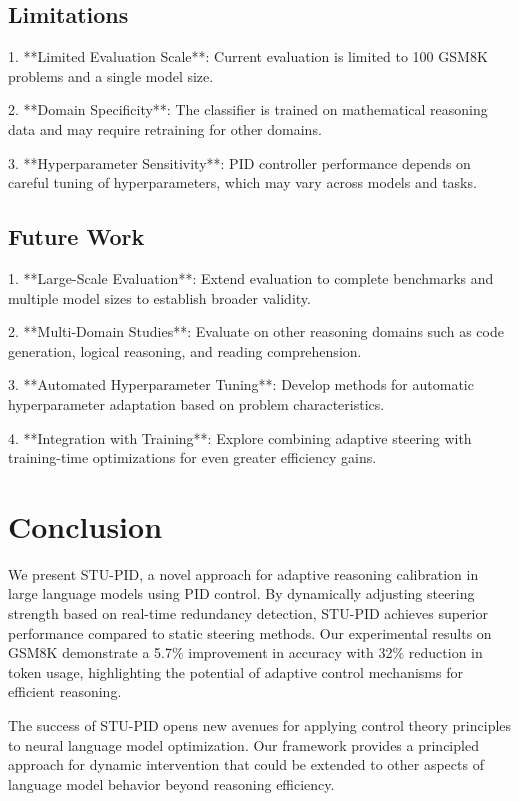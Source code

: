 \documentclass{article}
\begin{document}
\subsection{Limitations}

1. **Limited Evaluation Scale**: Current evaluation is limited to 100 GSM8K problems and a single model size.

2. **Domain Specificity**: The classifier is trained on mathematical reasoning data and may require retraining for other domains.

3. **Hyperparameter Sensitivity**: PID controller performance depends on careful tuning of hyperparameters, which may vary across models and tasks.

\subsection{Future Work}

1. **Large-Scale Evaluation**: Extend evaluation to complete benchmarks and multiple model sizes to establish broader validity.

2. **Multi-Domain Studies**: Evaluate on other reasoning domains such as code generation, logical reasoning, and reading comprehension.

3. **Automated Hyperparameter Tuning**: Develop methods for automatic hyperparameter adaptation based on problem characteristics.

4. **Integration with Training**: Explore combining adaptive steering with training-time optimizations for even greater efficiency gains.

\section{Conclusion}

We present STU-PID, a novel approach for adaptive reasoning calibration in large language models using PID control. By dynamically adjusting steering strength based on real-time redundancy detection, STU-PID achieves superior performance compared to static steering methods. Our experimental results on GSM8K demonstrate a 5.7\% improvement in accuracy with 32\% reduction in token usage, highlighting the potential of adaptive control mechanisms for efficient reasoning.

The success of STU-PID opens new avenues for applying control theory principles to neural language model optimization. Our framework provides a principled approach for dynamic intervention that could be extended to other aspects of language model behavior beyond reasoning efficiency.
\end{document}

